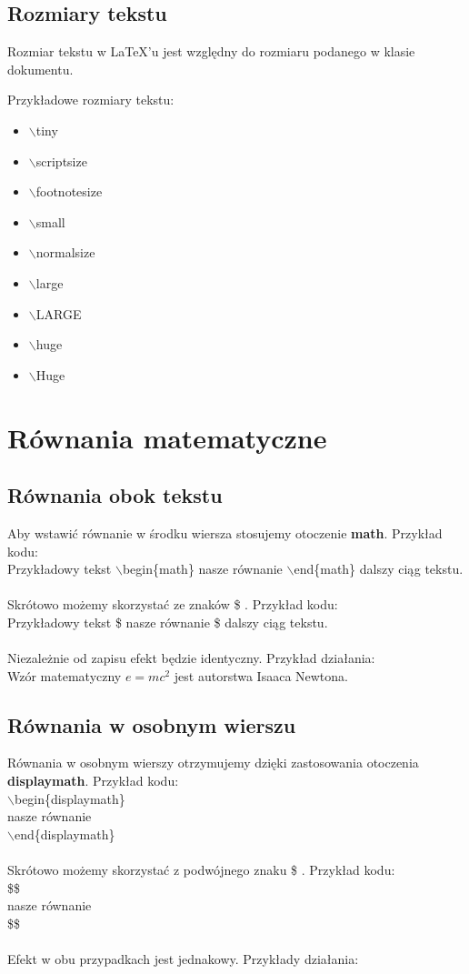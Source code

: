 \documentclass[a4paper, 12pt]{article}
\begin{document}
\subsection{Rozmiary tekstu}
Rozmiar tekstu w \LaTeX 'u jest względny do rozmiaru podanego w klasie dokumentu.

Przykładowe rozmiary tekstu:
\begin{itemize}
	\item \tiny{$\backslash$tiny}
	\item \scriptsize{$\backslash$scriptsize}
	\item \footnotesize{$\backslash$footnotesize}
	\item \small{$\backslash$small}
	\item \normalsize{$\backslash$normalsize}
	\item \large{$\backslash$large}
	\item \LARGE{$\backslash$LARGE}
	\item \huge{$\backslash$huge}
	\item \Huge{$\backslash$Huge}
\end{itemize}

\section{Równania matematyczne}
\subsection{Równania obok tekstu}
Aby wstawić równanie w środku wiersza stosujemy otoczenie \textbf{math}. Przykład kodu: \\
Przykładowy tekst $\backslash$begin\{math\} nasze równanie $\backslash$end\{math\} dalszy ciąg tekstu.\\
\\
Skrótowo możemy skorzystać ze znaków \$ . Przykład kodu:\\
Przykładowy tekst \$ nasze równanie \$ dalszy ciąg tekstu.\\
\\
Niezależnie od zapisu efekt będzie identyczny. Przykład działania: \\
Wzór matematyczny $e = mc^2$ jest autorstwa Isaaca Newtona. \\

\subsection{Równania w osobnym wierszu}
Równania w osobnym wierszy otrzymujemy dzięki zastosowania otoczenia \textbf{displaymath}. Przykład kodu:\\
$\backslash$begin\{displaymath\}\\
nasze równanie\\
$\backslash$end\{displaymath\}\\
\\
Skrótowo możemy skorzystać z podwójnego znaku \$ . Przykład kodu: \\
\$\$ \\
nasze równanie \\
\$\$ \\
\\
Efekt w obu przypadkach jest jednakowy. Przykłady działania:
\end{document}
